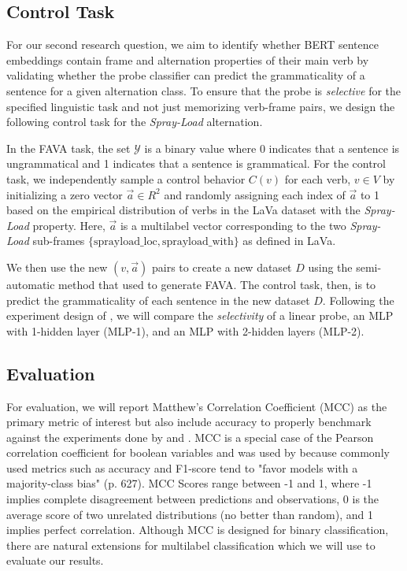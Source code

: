 \documentclass[11pt]{article}
\begin{document}
\subsection{Control Task}
For our second research question, we aim to identify whether BERT sentence embeddings contain frame and alternation properties of their main verb by validating whether the probe classifier can predict the grammaticality of a sentence for a given alternation class. To ensure that the probe is \textit{selective} for the specified linguistic task and not just memorizing verb-frame pairs, we design the following control task \citep{hewitt2019designing} for the \textit{Spray-Load} alternation. 

In the FAVA task, the set $\mathcal{Y}$ is a binary value where 0 indicates that a sentence is ungrammatical and 1 indicates that a sentence is grammatical. For the control task, we independently sample a control behavior $C(v)$ for each verb, $v \in V$ by initializing a zero vector $\vec{a} \in R^2$ and randomly assigning each index of $\vec{a}$ to 1 based on the empirical distribution of verbs in the LaVa dataset with the \textit{Spray-Load} property. Here, $\vec{a}$ is a multilabel vector corresponding to the two \textit{Spray-Load} sub-frames $\{\text{sprayload\_loc}, \text{sprayload\_with} \}$ as defined in LaVa. 

We then use the new $(v, \vec{a})$ pairs to create a new dataset $D$ using the semi-automatic method that \citet{hewitt2019designing} used to generate FAVA. The control task, then, is to predict the grammaticality of each sentence in the new dataset $D$. Following the experiment design of \citet{hewitt2019designing}, we will compare the \textit{selectivity} of a linear probe, an MLP with 1-hidden layer (MLP-1), and an MLP with 2-hidden layers (MLP-2).

\subsection{Evaluation}

For evaluation, we will report Matthew's Correlation Coefficient (MCC) \citep{MATTHEWS1975442} as the primary metric of interest but also include accuracy to properly benchmark against the experiments done by \citet{warstadt2019neural} and \citet{kann-etal-2019-verb}. MCC is a special case of the Pearson correlation coefficient for boolean variables and was used by \citet{warstadt2019neural} because commonly used metrics such as accuracy and F1-score tend to "favor models with a majority-class bias" (p. 627). MCC Scores range between -1 and 1, where -1 implies complete disagreement between predictions and observations, 0 is the average score of two unrelated distributions (no better than random), and 1 implies perfect correlation. Although MCC is designed for binary classification, there are natural extensions for multilabel classification which we will use to evaluate our results.
\end{document}
